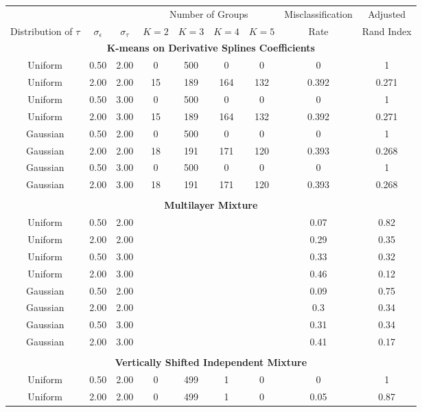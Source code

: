 \begin{table}[ht]
\begin{center}
\begin{tabular}{ccc|cccccc}
  \hline &&&\multicolumn{4}{c}{Number of Groups}&Misclassification&Adjusted\\ Distribution of $\tau$&$\sigma_{\epsilon}$&$\sigma_{\tau}$&$K=2$&$K=3$&$K=4$&$K=5$&Rate&Rand Index\\ \hline\multicolumn{9}{c}{\textbf{K-means on Derivative Splines Coefficients}}\\ Uniform & 0.50 & 2.00 & 0 & 500 & 0 & 0 & 0 & 1 \\ 
  Uniform & 2.00 & 2.00 & 15 & 189 & 164 & 132 & 0.392 & 0.271 \\ 
  Uniform & 0.50 & 3.00 & 0 & 500 & 0 & 0 & 0 & 1 \\ 
  Uniform & 2.00 & 3.00 & 15 & 189 & 164 & 132 & 0.392 & 0.271 \\ 
  Gaussian & 0.50 & 2.00 & 0 & 500 & 0 & 0 & 0 & 1 \\ 
  Gaussian & 2.00 & 2.00 & 18 & 191 & 171 & 120 & 0.393 & 0.268 \\ 
  Gaussian & 0.50 & 3.00 & 0 & 500 & 0 & 0 & 0 & 1 \\ 
  Gaussian & 2.00 & 3.00 & 18 & 191 & 171 & 120 & 0.393 & 0.268 \\ 
   \\ \multicolumn{9}{c}{\textbf{Multilayer Mixture}}\\Uniform & 0.50 & 2.00 &  &  &  &  & 0.07 & 0.82 \\ 
  Uniform & 2.00 & 2.00 &  &  &  &  & 0.29 & 0.35 \\ 
  Uniform & 0.50 & 3.00 &  &  &  &  & 0.33 & 0.32 \\ 
  Uniform & 2.00 & 3.00 &  &  &  &  & 0.46 & 0.12 \\ 
  Gaussian & 0.50 & 2.00 &  &  &  &  & 0.09 & 0.75 \\ 
  Gaussian & 2.00 & 2.00 &  &  &  &  & 0.3 & 0.34 \\ 
  Gaussian & 0.50 & 3.00 &  &  &  &  & 0.31 & 0.34 \\ 
  Gaussian & 2.00 & 3.00 &  &  &  &  & 0.41 & 0.17 \\ 
     \\ \multicolumn{9}{c}{\textbf{Vertically Shifted Independent Mixture}}\\Uniform & 0.50 & 2.00 & 0 & 499 & 1 & 0 & 0 & 1 \\ 
  Uniform & 2.00 & 2.00 & 0 & 499 & 1 & 0 & 0.05 & 0.87 \\ 

\end{tabular}
\end{center}
\end{table}
